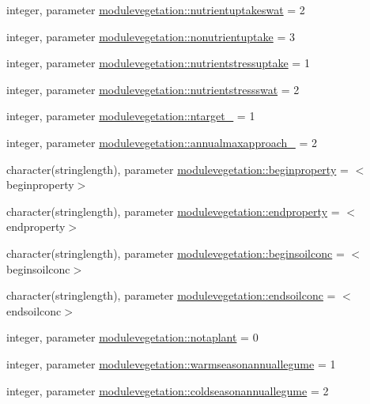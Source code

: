 \begin{DoxyCompactItemize}
\item 
integer, parameter \mbox{\hyperlink{namespacemodulevegetation_ae972c42e63c952384ea85f900c6d83ce}{modulevegetation\+::nutrientuptakeswat}} = 2
\item 
integer, parameter \mbox{\hyperlink{namespacemodulevegetation_adb9411841d04fe23f0b3e26d0cfa4da6}{modulevegetation\+::nonutrientuptake}} = 3
\item 
integer, parameter \mbox{\hyperlink{namespacemodulevegetation_a0c5b6ced40e0ad90e60f119c725a7add}{modulevegetation\+::nutrientstressuptake}} = 1
\item 
integer, parameter \mbox{\hyperlink{namespacemodulevegetation_aeae6608b85511eb5af5fe147eef4c893}{modulevegetation\+::nutrientstressswat}} = 2
\item 
integer, parameter \mbox{\hyperlink{namespacemodulevegetation_aab05f943f7f926b8835fc8feda175327}{modulevegetation\+::ntarget\+\_\+}} = 1
\item 
integer, parameter \mbox{\hyperlink{namespacemodulevegetation_a6c9a5abf22d1f3911992e9fe7ca54961}{modulevegetation\+::annualmaxapproach\+\_\+}} = 2
\item 
character(stringlength), parameter \mbox{\hyperlink{namespacemodulevegetation_af5c39235da7ffa5b02b08e4b5bdd08e0}{modulevegetation\+::beginproperty}} = \textquotesingle{}$<$beginproperty$>$\textquotesingle{}
\item 
character(stringlength), parameter \mbox{\hyperlink{namespacemodulevegetation_a73f3f232bb7f070329fd6d42320ca563}{modulevegetation\+::endproperty}} = \textquotesingle{}$<$endproperty$>$\textquotesingle{}
\item 
character(stringlength), parameter \mbox{\hyperlink{namespacemodulevegetation_aac537c41b68962e791c65feb871f5cce}{modulevegetation\+::beginsoilconc}} = \textquotesingle{}$<$beginsoilconc$>$\textquotesingle{}
\item 
character(stringlength), parameter \mbox{\hyperlink{namespacemodulevegetation_aae3895207aa7a807bcad1a2dbd43ffaa}{modulevegetation\+::endsoilconc}} = \textquotesingle{}$<$endsoilconc$>$\textquotesingle{}
\item 
integer, parameter \mbox{\hyperlink{namespacemodulevegetation_ab82ae872dc102775656928be45fa95e7}{modulevegetation\+::notaplant}} = 0
\item 
integer, parameter \mbox{\hyperlink{namespacemodulevegetation_ac51d5cc86df047d333a5cdc12fa3aac9}{modulevegetation\+::warmseasonannuallegume}} = 1
\item 
integer, parameter \mbox{\hyperlink{namespacemodulevegetation_a00205bc4eb26dcc7864edb912b674069}{modulevegetation\+::coldseasonannuallegume}} = 2

\end{DoxyCompactItemize}
